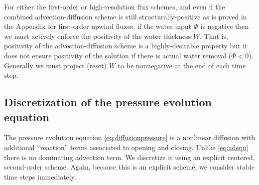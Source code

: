 \documentclass[11pt,final]{amsart}%
\begin{document}
For either the first-order or high-resolution flux schemes, and even if the combined advection-diffusion scheme is still structurally-positive as is proved in the Appendix for first-order upwind fluxes, if the water input $\Phi$ is negative then we must actively enforce the positivity of the water thickness $W$.  That is, positivity of the advection-diffusion scheme is a highly-desirable property but it does not ensure positivity of the solution if there is actual water removal ($\Phi < 0$).  Generally we must project (reset) $W$ to be nonnegative at the end of each time step.


\subsection*{Discretization of the pressure evolution equation}  The pressure evolution equation \eqref{eq:diffusionpressure} is a nonlinear diffusion with additional ``reaction'' terms associated to opening and closing.  Unlike \eqref{eq:adeqn} there is no dominating advection term.  We discretize it using an explicit centered, second-order scheme.  Again, because this is an explicit scheme, we consider stable time steps immediately.
\end{document}
